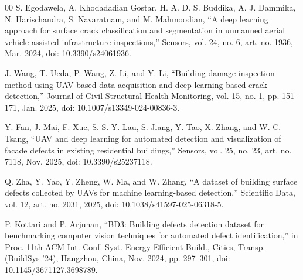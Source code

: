 \documentclass[conference]{IEEEtran}
\begin{document}
\begin{thebibliography}{00}
 S. Egodawela, A. Khodadadian Gostar, H. A. D. S. Buddika, A. J. Dammika, N. Harischandra, S. Navaratnam, and M. Mahmoodian, ``A deep learning approach for surface crack classification and segmentation in unmanned aerial vehicle assisted infrastructure inspections,'' Sensors, vol. 24, no. 6, art. no. 1936, Mar. 2024, doi: 10.3390/s24061936.

 J. Wang, T. Ueda, P. Wang, Z. Li, and Y. Li, ``Building damage inspection method using UAV-based data acquisition and deep learning-based crack detection,'' Journal of Civil Structural Health Monitoring, vol. 15, no. 1, pp. 151--171, Jan. 2025, doi: 10.1007/s13349-024-00836-3.

 Y. Fan, J. Mai, F. Xue, S. S. Y. Lau, S. Jiang, Y. Tao, X. Zhang, and W. C. Tsang, ``UAV and deep learning for automated detection and visualization of facade defects in existing residential buildings,'' Sensors, vol. 25, no. 23, art. no. 7118, Nov. 2025, doi: 10.3390/s25237118.

 Q. Zha, Y. Yao, Y. Zheng, W. Ma, and W. Zhang, ``A dataset of building surface defects collected by UAVs for machine learning-based detection,'' Scientific Data, vol. 12, art. no. 2031, 2025, doi: 10.1038/s41597-025-06318-5.

 P. Kottari and P. Arjunan, ``BD3: Building defects detection dataset for benchmarking computer vision techniques for automated defect identification,'' in Proc. 11th ACM Int. Conf. Syst. Energy-Efficient Build., Cities, Transp. (BuildSys '24), Hangzhou, China, Nov. 2024, pp. 297--301, doi: 10.1145/3671127.3698789.

\end{thebibliography}
\end{document}
